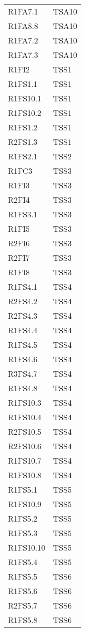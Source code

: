 {\begin{longtable}{C{4cm} C{4cm}}
R1FA7.1 & TSA10  \\
R1FA8.8 & TSA10  \\
R1FA7.2 & TSA10  \\
R1FA7.3 & TSA10  \\


R1FI2 & TSS1\\
R1FS1.1 & TSS1 \\
R1FS10.1 & TSS1 \\
R1FS10.2 & TSS1 \\
R1FS1.2 & TSS1 \\
R2FS1.3 & TSS1 \\
R1FS2.1 & TSS2 \\
R1FC3 & TSS3 \\
R1FI3 & TSS3 \\
R2FI4 & TSS3 \\
R1FS3.1 & TSS3 \\
R1FI5 & TSS3 \\
R2FI6 & TSS3 \\
R2FI7 & TSS3 \\
R1FI8 & TSS3 \\
R1FS4.1 & TSS4 \\
R2FS4.2 & TSS4 \\
R2FS4.3 & TSS4 \\
R1FS4.4 & TSS4 \\
R1FS4.5 & TSS4 \\
R1FS4.6 & TSS4 \\
R3FS4.7 & TSS4 \\
R1FS4.8 & TSS4 \\
R1FS10.3 & TSS4 \\
R1FS10.4 & TSS4 \\
R2FS10.5 & TSS4 \\
R2FS10.6 & TSS4 \\
R1FS10.7 & TSS4 \\
R1FS10.8 & TSS4 \\
R1FS5.1 & TSS5 \\
R1FS10.9 & TSS5 \\
R1FS5.2 & TSS5 \\
R1FS5.3 & TSS5 \\
R1FS10.10 & TSS5 \\
R1FS5.4 & TSS5 \\
R1FS5.5 & TSS6 \\
R1FS5.6 & TSS6 \\
R2FS5.7 & TSS6 \\
R1FS5.8 & TSS6 \\

\end{longtable}}
